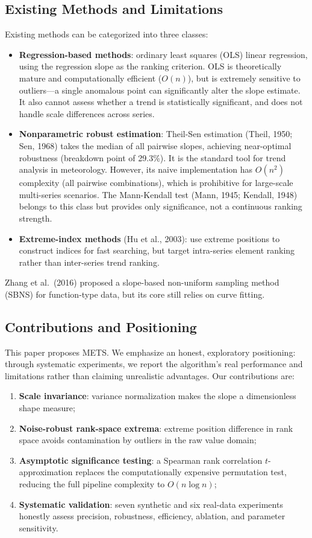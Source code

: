 \documentclass[11pt]{article}
\begin{document}
\subsection{Existing Methods and Limitations}
Existing methods can be categorized into three classes:

\begin{itemize}
\item \textbf{Regression-based methods}: ordinary least squares (OLS) linear regression, using the regression slope as the ranking criterion. OLS is theoretically mature and computationally efficient ($O(n)$), but is extremely sensitive to outliers---a single anomalous point can significantly alter the slope estimate. It also cannot assess whether a trend is statistically significant, and does not handle scale differences across series.
\item \textbf{Nonparametric robust estimation}: Theil-Sen estimation (Theil, 1950; Sen, 1968) takes the median of all pairwise slopes, achieving near-optimal robustness (breakdown point of 29.3\%). It is the standard tool for trend analysis in meteorology. However, its naive implementation has $O(n^2)$ complexity (all pairwise combinations), which is prohibitive for large-scale multi-series scenarios. The Mann-Kendall test (Mann, 1945; Kendall, 1948) belongs to this class but provides only significance, not a continuous ranking strength.
\item \textbf{Extreme-index methods} (Hu et al., 2003): use extreme positions to construct indices for fast searching, but target intra-series element ranking rather than inter-series trend ranking.
\end{itemize}

Zhang et al.\ (2016) proposed a slope-based non-uniform sampling method (SBNS) for function-type data, but its core still relies on curve fitting.

\subsection{Contributions and Positioning}
This paper proposes METS. We emphasize an honest, exploratory positioning: through systematic experiments, we report the algorithm's real performance and limitations rather than claiming unrealistic advantages. Our contributions are:

\begin{enumerate}
\item \textbf{Scale invariance}: variance normalization makes the slope a dimensionless shape measure;
\item \textbf{Noise-robust rank-space extrema}: extreme position difference in rank space avoids contamination by outliers in the raw value domain;
\item \textbf{Asymptotic significance testing}: a Spearman rank correlation $t$-approximation replaces the computationally expensive permutation test, reducing the full pipeline complexity to $O(n \log n)$;
\item \textbf{Systematic validation}: seven synthetic and six real-data experiments honestly assess precision, robustness, efficiency, ablation, and parameter sensitivity.
\end{enumerate}
\end{document}
